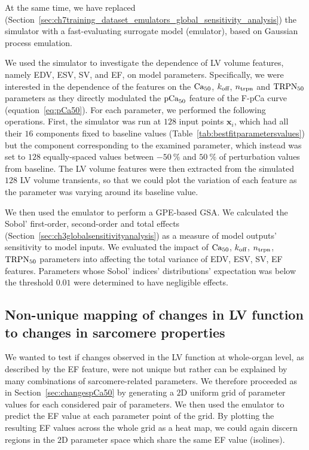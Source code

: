 \vspace{0.2cm}\noindent
At the same time, we have replaced (Section~\ref{sec:ch7training_dataset_emulators_global_sensitivity_analysis}) the simulator with a fast-evaluating surrogate model (emulator), based on Gaussian process emulation.

\vspace{0.2cm}
We used the simulator to investigate the dependence of LV volume features, namely EDV, ESV, SV, and EF, on model parameters. Specifically, we were interested in the dependence of the features on the $\textrm{Ca}_{50}$, $k_{\textrm{off}}$, $n_{\textrm{trpn}}$ and $\textrm{TRPN}_{50}$ parameters as they directly modulated the $\textrm{pCa}_{50}$ feature of the F-pCa curve (equation~\eqref{eq:pCa50}). For each parameter, we performed the following operations. First, the simulator was run at $128$ input points $\mathbf{x}_i$, which had all their $16$ components fixed to baseline values (Table~\ref{tab:bestfitparametersvalues}) but the component corresponding to the examined parameter, which instead was set to $128$ equally-spaced values between $-\SI{50}{\percent}$ and $\SI{50}{\percent}$ of perturbation values from baseline. The LV volume features were then extracted from the simulated $128$ LV volume transients, so that we could plot the variation of each feature as the parameter was varying around its baseline value.

\vspace{0.2cm}
We then used the emulator to perform a GPE-based GSA. We calculated the Sobol' first-order, second-order and total effects (Section~\ref{sec:ch3globalsensitivityanalysis}) as a measure of model outputs' sensitivity to model inputs. We evaluated the impact of $\textrm{Ca}_{50}$, $k_{\textrm{off}}$, $n_{\textrm{trpn}}$, $\textrm{TRPN}_{50}$ parameters into affecting the total variance of EDV, ESV, SV, EF features. Parameters whose Sobol' indices' distributions' expectation was below the threshold $0.01$ were determined to have negligible effects.


%
%
%
\subsection{Non-unique mapping of changes in LV function to changes in sarcomere properties}\label{sec:changesLVfunction}
We wanted to test if changes observed in the LV function at whole-organ level, as described by the EF feature, were not unique but rather can be explained by many combinations of sarcomere-related parameters. We therefore proceeded as in Section~\ref{sec:changespCa50} by generating a $2$D uniform grid of parameter values for each considered pair of parameters. We then used the emulator to predict the EF value at each parameter point of the grid. By plotting the resulting EF values across the whole grid as a heat map, we could again discern regions in the $2$D parameter space which share the same EF value (isolines).


